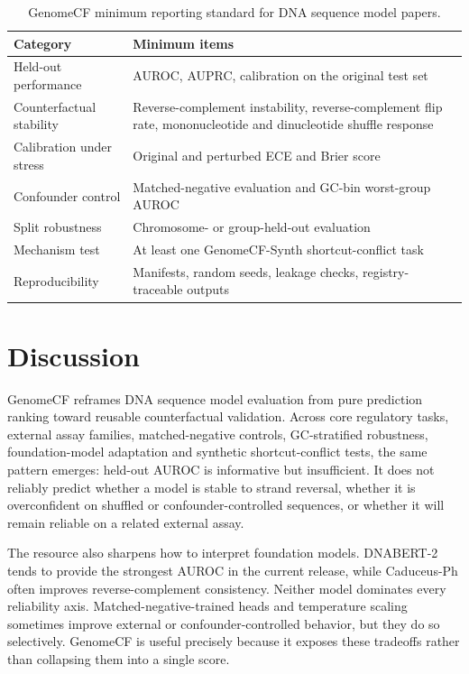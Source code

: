\documentclass[11pt]{article}
\begin{document}
\begin{table}[t]
  \centering
  \caption{GenomeCF minimum reporting standard for DNA sequence model papers.}
  \label{tab:checklist}
  \small
  \begin{tabular}{p{5.4cm}p{8.8cm}}
    \toprule
    Category & Minimum items \\
    \midrule
    Held-out performance & AUROC, AUPRC, calibration on the original test set \\
    Counterfactual stability & Reverse-complement instability, reverse-complement flip rate, mononucleotide and dinucleotide shuffle response \\
    Calibration under stress & Original and perturbed ECE and Brier score \\
    Confounder control & Matched-negative evaluation and GC-bin worst-group AUROC \\
    Split robustness & Chromosome- or group-held-out evaluation \\
    Mechanism test & At least one GenomeCF-Synth shortcut-conflict task \\
    Reproducibility & Manifests, random seeds, leakage checks, registry-traceable outputs \\
    \bottomrule
  \end{tabular}
\end{table}

\section{Discussion}
GenomeCF reframes DNA sequence model evaluation from pure prediction ranking toward reusable counterfactual validation. Across core regulatory tasks, external assay families, matched-negative controls, GC-stratified robustness, foundation-model adaptation and synthetic shortcut-conflict tests, the same pattern emerges: held-out AUROC is informative but insufficient. It does not reliably predict whether a model is stable to strand reversal, whether it is overconfident on shuffled or confounder-controlled sequences, or whether it will remain reliable on a related external assay.

The resource also sharpens how to interpret foundation models. DNABERT-2 tends to provide the strongest AUROC in the current release, while Caduceus-Ph often improves reverse-complement consistency. Neither model dominates every reliability axis. Matched-negative-trained heads and temperature scaling sometimes improve external or confounder-controlled behavior, but they do so selectively. GenomeCF is useful precisely because it exposes these tradeoffs rather than collapsing them into a single score.
\end{document}
